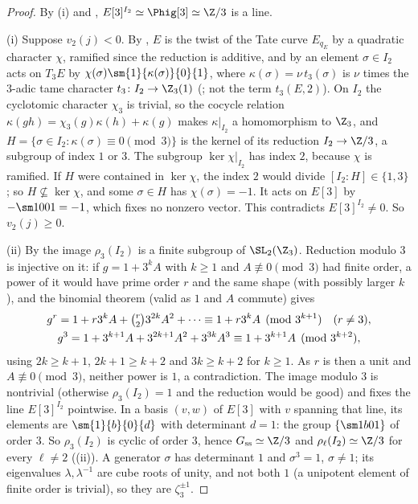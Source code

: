 \begin{proof}
By (i) and , $E[3]^{I_2}\simeq\Phig[3]\simeq\Z/3$
is a line.

(i) Suppose $v_2(j)<0$. By , $E$ is the twist of the Tate curve $E_{q_E}$ by a
quadratic character $\chi$, ramified since the reduction is additive, and by  an element
$\sigma\in I_2$ acts on $T_3E$ by $\chi(\sigma)\sm{1}{\kappa(\sigma)}{0}{1}$, where $\kappa(\sigma)=\nu\,t_3(\sigma)$ is $\nu$ times the $3$-adic tame
character $t_3\colon I_2\to\Z_3(1)$ (; not the term $t_3(E,2)$). On $I_2$ the cyclotomic character $\chi_3$ is
trivial, so the cocycle relation $\kappa(gh)=\chi_3(g)\kappa(h)+\kappa(g)$ makes $\kappa|_{I_2}$ a homomorphism to $\Z_3$, and
$H=\{\sigma\in I_2:\kappa(\sigma)\equiv0\pmod3\}$ is the kernel of its reduction $I_2\to\Z/3$, a subgroup of index $1$ or $3$. The
subgroup $\ker\chi|_{I_2}$ has index $2$, because $\chi$ is ramified. If $H$ were contained in $\ker\chi$, the index $2$ would divide
$[I_2:H]\in\{1,3\}$; so $H\not\subseteq\ker\chi$, and some $\sigma\in H$ has $\chi(\sigma)=-1$. It acts on $E[3]$ by
$-\sm1001=-1$, which fixes no nonzero vector. This contradicts $E[3]^{I_2}\ne0$. So $v_2(j)\ge0$.

(ii) By  the image $\rho_3(I_2)$ is a finite subgroup of $\SL_2(\Z_3)$. Reduction modulo $3$ is
injective on it: if $g=1+3^kA$ with $k\ge1$ and $A\not\equiv0\pmod3$ had finite order, a power of it would have prime order $r$
and the same shape (with possibly larger $k$), and the binomial theorem (valid as $1$ and $A$ commute) gives
\begin{gather*}
g^r=1+r3^kA+\tbinom r2 3^{2k}A^2+\cdots\equiv1+r3^kA\pmod{3^{k+1}}\quad(r\ne3),\\
g^3=1+3^{k+1}A+3^{2k+1}A^2+3^{3k}A^3\equiv1+3^{k+1}A\pmod{3^{k+2}},
\end{gather*}
using $2k\ge k+1$, $2k+1\ge k+2$ and $3k\ge k+2$ for $k\ge1$. As $r$ is then a unit and $A\not\equiv0\pmod 3$, neither power is
$1$, a contradiction. The image modulo $3$ is nontrivial (otherwise $\rho_3(I_2)=1$ and the reduction would be good) and fixes
the line $E[3]^{I_2}$ pointwise. In a basis $(v,w)$ of $E[3]$ with $v$ spanning that line, its elements are
$\sm{1}{b}{0}{d}$ with determinant $d=1$: the group $\{\sm1b01\}$ of order $3$. So $\rho_3(I_2)$ is cyclic of order $3$,
hence $G_{\mathrm{ss}}\simeq\Z/3$ and $\rho_\ell(I_2)\simeq\Z/3$ for every $\ell\ne2$ ((ii)). A generator
$\sigma$ has determinant $1$ and $\sigma^3=1$, $\sigma\ne1$; its eigenvalues $\lambda,\lambda^{-1}$ are cube roots of unity, and not both $1$
(a unipotent element of finite order is trivial), so they are $\zeta_3^{\pm1}$.


\end{proof}

